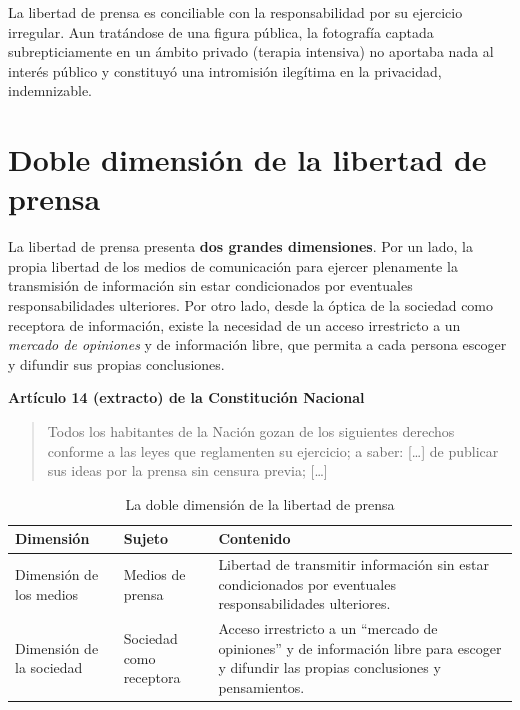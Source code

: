 \documentclass[12pt,oneside]{book}
\newenvironment{normacitada}[1]{%
    \medskip
    \noindent\textbf{#1}\par\smallskip
    \begin{quote}\itshape
}{%
    \end{quote}
    \medskip
}
\begin{document}
\begin{important}
La libertad de prensa es conciliable con la responsabilidad por su ejercicio irregular. Aun tratándose de una figura pública, la fotografía captada subrepticiamente en un ámbito privado (terapia intensiva) no aportaba nada al interés público y constituyó una intromisión ilegítima en la privacidad, indemnizable.
\end{important}

\section{Doble dimensión de la libertad de prensa}

La libertad de prensa presenta \textbf{dos grandes dimensiones}. Por un lado, la propia libertad de los medios de comunicación para ejercer plenamente la transmisión de información sin estar condicionados por eventuales responsabilidades ulteriores. Por otro lado, desde la óptica de la sociedad como receptora de información, existe la necesidad de un acceso irrestricto a un \emph{mercado de opiniones} y de información libre, que permita a cada persona escoger y difundir sus propias conclusiones.

\begin{normacitada}{Artículo 14 (extracto) de la Constitución Nacional}
Todos los habitantes de la Nación gozan de los siguientes derechos conforme a las leyes que reglamenten su ejercicio; a saber: [\ldots] de publicar sus ideas por la prensa sin censura previa; [\ldots]
\end{normacitada}

\begin{table}[H]
\centering
\caption{La doble dimensión de la libertad de prensa}
\begin{tabularx}{\textwidth}{>{\raggedright\arraybackslash}p{} >{\raggedright\arraybackslash}p{} X}
\toprule
\textbf{Dimensión} & \textbf{Sujeto} & \textbf{Contenido} \\
\midrule
Dimensión de los medios & Medios de prensa & Libertad de transmitir información sin estar condicionados por eventuales responsabilidades ulteriores. \\
Dimensión de la sociedad & Sociedad como receptora & Acceso irrestricto a un ``mercado de opiniones'' y de información libre para escoger y difundir las propias conclusiones y pensamientos. \\
\bottomrule
\end{tabularx}
\end{table}
\end{document}
